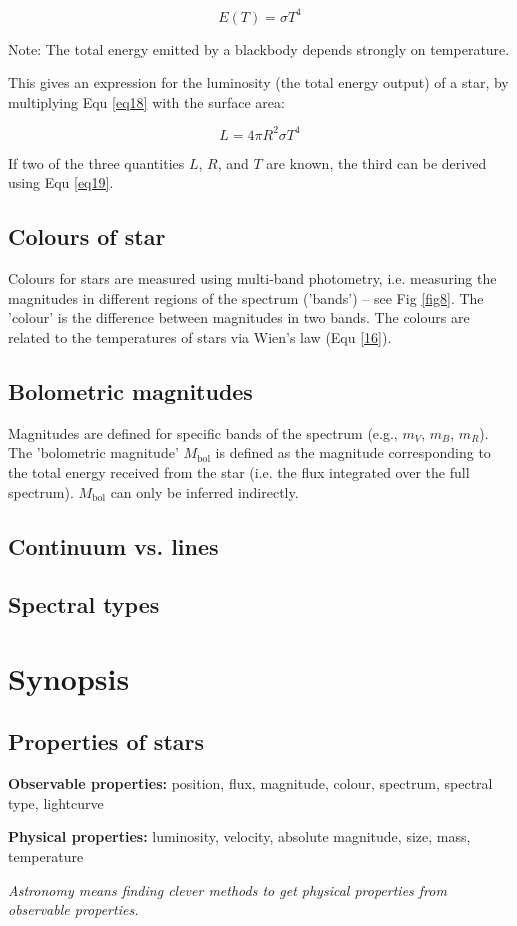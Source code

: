 \begin{equation}
E(T) = \sigma T^4
\label{eq18}
\end{equation}

Note: The total energy emitted by a blackbody depends strongly on temperature.

This gives an expression for the luminosity (the total energy output) of a star, by multiplying Equ \ref{eq18} with the surface area:

\begin{equation}
L = 4 \pi R^2 \sigma T^4
\label{eq19}
\end{equation}

If two of the three quantities $L$, $R$, and $T$ are known, the third can be derived using Equ \eqref{eq19}.

\subsection{Colours of star}

Colours for stars are measured using multi-band photometry, i.e. measuring the magnitudes in different regions of the spectrum ('bands') -- see Fig \ref{fig8}. The 'colour' is the difference between magnitudes in two bands. The colours are related to the temperatures of stars via Wien's law (Equ \eqref{16}).

\subsection{Bolometric magnitudes}

Magnitudes are defined for specific bands of the spectrum (e.g., $m_V$, $m_B$, $m_R$).  The 'bolometric magnitude' $M_{\mathrm{bol}}$ is defined as the magnitude corresponding to the total energy received from the star (i.e. the flux integrated over the full spectrum). $M_{\mathrm{bol}}$ can only be inferred indirectly.

\subsection{Continuum vs. lines}

\subsection{Spectral types}

\section{Synopsis}

\subsection{Properties of stars}

\textbf{Observable properties:} position, flux, magnitude, colour, spectrum, spectral type, lightcurve

\textbf{Physical properties:} luminosity, velocity, absolute magnitude, size, mass, temperature

\textit{Astronomy means finding clever methods to get physical properties from observable properties.}

